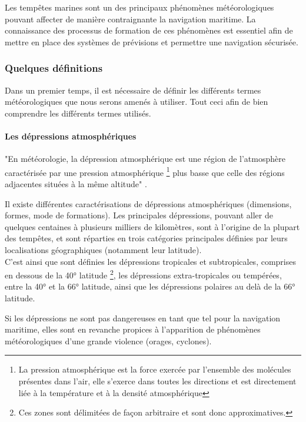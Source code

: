 \documentclass[12pt]{report}
\begin{document}
        Les tempêtes marines sont un des principaux phénomènes météorologiques pouvant affecter de manière contraignante la navigation maritime.
        La connaissance des processus de formation de ces phénomènes est essentiel afin de mettre en place des systèmes de prévisions et permettre une navigation sécurisée.
    \subsubsection{Quelques définitions}
        Dans un premier temps, il est nécessaire de définir les différents termes météorologiques que nous serons amenés à utiliser. Tout ceci afin de bien comprendre les différents termes utilisés.

        \paragraph{Les dépressions atmosphériques} 
        
        "En météorologie, la dépression atmosphérique est une région de l'atmosphère caractérisée par une pression atmosphérique 
        \footnote{La pression atmosphérique est la force exercée par l'ensemble des molécules présentes dans l'air, elle s'exerce dans toutes les directions et est directement liée à la température et à la densité atmosphérique} 
        plus basse que celle des régions adjacentes situées à la même altitude" \cite{def depression}.
        
        Il existe différentes caractérisations de dépressions atmosphériques (dimensions, formes, mode de formations). Les principales dépressions, pouvant aller de quelques centaines à plusieurs milliers de kilomètres, sont à l'origine de la plupart des tempêtes, et sont réparties en trois catégories principales définies par leurs localisations géographiques (notamment leur latitude).\\
        C'est ainsi que sont définies les dépressions tropicales et subtropicales, comprises en dessous de la 40° latitude
        \footnote{Ces zones sont délimitées de façon arbitraire et sont donc approximatives.},
        les dépressions extra-tropicales ou tempérées, entre la 40° et la 66° latitude, ainsi que les dépressions polaires au delà de la 66° latitude.
        
        Si les dépressions ne sont pas dangereuses en tant que tel pour la navigation maritime, elles sont en revanche propices à l'apparition de phénomènes météorologiques d'une grande violence (orages, cyclones).\\
        
\end{document}
